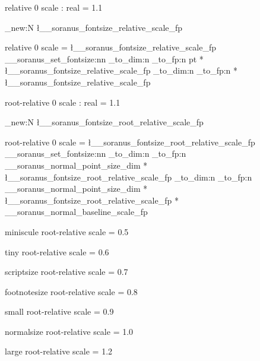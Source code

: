  { relative } { 0 }
  {
    scale : real = 1.1
  }


\fp_new:N \l__soranus_fontsize_relative_scale_fp

 { relative } { 0 }
  {
    scale = \l__soranus_fontsize_relative_scale_fp
  }
  {
    \__soranus_set_fontsize:nn
      {
        \fp_to_dim:n
          {
            \dim_to_fp:n { \f@size pt }
            * \l__soranus_fontsize_relative_scale_fp
          }
      }
      {
        \fp_to_dim:n
          {
            \dim_to_fp:n { \f@baselineskip }
            * \l__soranus_fontsize_relative_scale_fp
          }
      }
  }


%

 { root-relative } { 0 }
  {
    scale : real = 1.1
  }


\fp_new:N \l__soranus_fontsize_root_relative_scale_fp

 { root-relative } { 0 }
  {
    scale = \l__soranus_fontsize_root_relative_scale_fp
  }
  {
    \__soranus_set_fontsize:nn
      {
        \fp_to_dim:n
          {
            \dim_to_fp:n { \g__soranus_normal_point_size_dim }
            * \l__soranus_fontsize_root_relative_scale_fp
          }
      }
      {
        \fp_to_dim:n
          {
            \dim_to_fp:n { \g__soranus_normal_point_size_dim }
            * \l__soranus_fontsize_root_relative_scale_fp
            * \g__soranus_normal_baseline_scale_fp
          }
      }
  }


%

 { miniscule } { root-relative }
  {
    scale = 0.5
  }

 { tiny } { root-relative }
  {
    scale = 0.6
  }

 { scriptsize } { root-relative }
  {
    scale = 0.7
  }

 { footnotesize } { root-relative }
  {
    scale = 0.8
  }

 { small } { root-relative }
  {
    scale = 0.9
  }

 { normalsize } { root-relative }
  {
    scale = 1.0
  }

 { large } { root-relative }
  {
    scale = 1.2
  }

